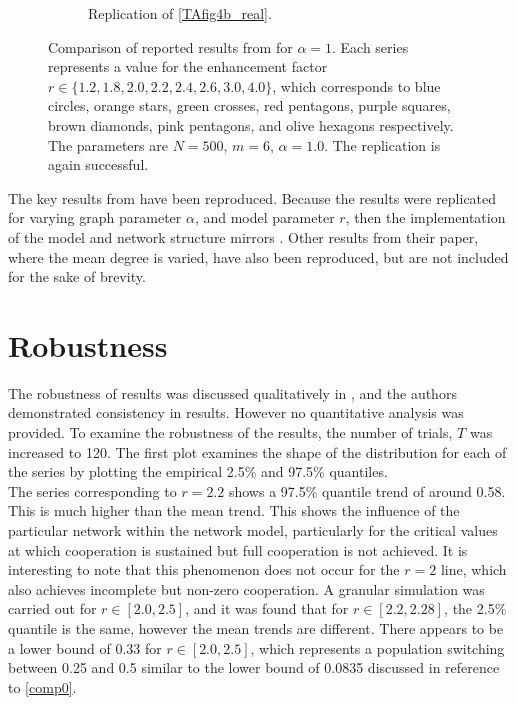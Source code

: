 \begin{figure}[!h]
\begin{subfigure}[b]{0.45\textwidth}
    \caption{Replication of \ref{TAfig4b_real}. }
    \label{TAfig4b}
  \end{subfigure}
  \caption{Comparison of reported results from \cite{RN49} for $\alpha = 1$. Each series represents a value for the enhancement factor $r \in \{1.2, 1.8, 2.0, 2.2, 2.4, 2.6, 3.0, 4.0\}$, which corresponds to blue circles, orange stars, green crosses, red pentagons, purple squares, brown diamonds, pink pentagons, and olive hexagons respectively. The parameters are $N=500$, $m=6$, $\alpha = 1.0$. The replication is again successful. } \label{comp2}
\end{figure} 
\FloatBarrier

The key results from \cite{RN49} have been reproduced. Because the results were replicated for varying graph parameter $\alpha$, and model parameter $r$, then the implementation of the model and network structure mirrors \cite{RN49}. Other results from their paper, where the mean degree is varied, have also been reproduced, but are not included for the sake of brevity.\\


\section{Robustness}
The robustness of results was discussed qualitatively in \cite{RN49}, and the authors demonstrated consistency in results. However no quantitative analysis was provided. To examine the robustness of the results, the number of trials, $T$ was increased to 120. The first plot examines the shape of the distribution for each of the series by plotting the empirical 2.5\% and 97.5\% quantiles. \\

\FloatBarrier
{}
\FloatBarrier
The series corresponding to $r=2.2$ shows a 97.5\% quantile trend of around 0.58. This is much higher than the mean trend. This shows the influence of the particular network within the network model, particularly for the critical values at which cooperation is sustained but full cooperation is not achieved. It is interesting to note that this phenomenon does not occur for the $r=2$ line, which also achieves incomplete but non-zero cooperation. A granular simulation was carried out for $r \in [2.0,2.5]$, and it was found that for $r \in [2.2, 2.28]$, the 2.5\% quantile is the same, however the mean trends are different. There appears to be a lower bound of 0.33 for $r \in [2.0, 2.5]$, which represents a population switching between 0.25 and 0.5 similar to the lower bound of 0.0835 discussed in reference to \ref{comp0}.\\

